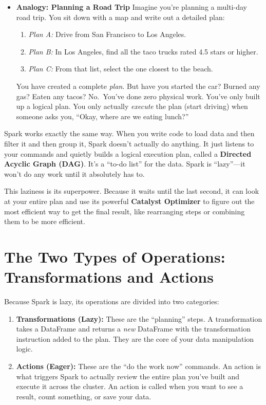 \documentclass[
  letterpaper,
  DIV=11,
  numbers=noendperiod]{scrreprt}
\providecommand{\tightlist}{%
  \setlength{\itemsep}{0pt}\setlength{\parskip}{0pt}}
\begin{document}
\begin{itemize}
\tightlist
\item
  \textbf{Analogy: Planning a Road Trip} Imagine you're planning a
  multi-day road trip. You sit down with a map and write out a detailed
  plan:

  \begin{enumerate}
  \def\labelenumi{\arabic{enumi}.}
  \tightlist
  \item
    \emph{Plan A:} Drive from San Francisco to Los Angeles.
  \item
    \emph{Plan B:} In Los Angeles, find all the taco trucks rated 4.5
    stars or higher.
  \item
    \emph{Plan C:} From that list, select the one closest to the beach.
  \end{enumerate}

  You have created a complete \emph{plan}. But have you started the car?
  Burned any gas? Eaten any tacos? No.~You've done zero physical work.
  You've only built up a logical plan. You only actually \emph{execute}
  the plan (start driving) when someone asks you, ``Okay, where are we
  eating lunch?''
\end{itemize}

Spark works exactly the same way. When you write code to load data and
then filter it and then group it, Spark doesn't actually do anything. It
just listens to your commands and quietly builds a logical execution
plan, called a \textbf{Directed Acyclic Graph (DAG)}. It's a ``to-do
list'' for the data. Spark is ``lazy''---it won't do any work until it
absolutely has to.

This laziness is its superpower. Because it waits until the last second,
it can look at your entire plan and use its powerful \textbf{Catalyst
Optimizer} to figure out the most efficient way to get the final result,
like rearranging steps or combining them to be more efficient.

\section{The Two Types of Operations: Transformations and
Actions}\label{the-two-types-of-operations-transformations-and-actions}

Because Spark is lazy, its operations are divided into two categories:

\begin{enumerate}
\def\labelenumi{\arabic{enumi}.}
\item
  \textbf{Transformations (Lazy):} These are the ``planning'' steps. A
  transformation takes a DataFrame and returns a \emph{new} DataFrame
  with the transformation instruction added to the plan. They are the
  core of your data manipulation logic.
\item
  \textbf{Actions (Eager):} These are the ``do the work now'' commands.
  An action is what triggers Spark to actually review the entire plan
  you've built and execute it across the cluster. An action is called
  when you want to see a result, count something, or save your data.
\end{enumerate}
\end{document}
